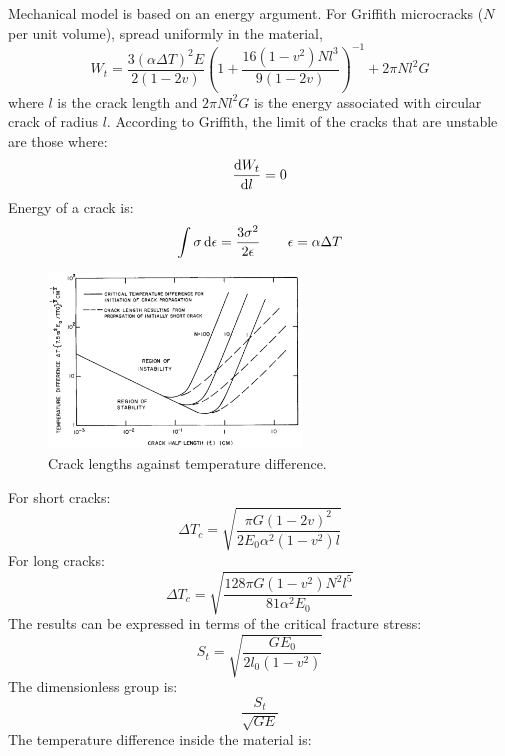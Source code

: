 Mechanical model is based on an energy argument. For Griffith microcracks ($N$ per unit volume), spread uniformly in the material,
\begin{equation}
    W_t = \frac{3\left(\alpha\Delta T\right)^2E}{2\left(1-2v\right)}\left(1 + \frac{16\left(1-v^2\right)Nl^3}{9\left(1-2v\right)}\right)^{-1} + 2\pi Nl^2 G
\end{equation}
where $l$ is the crack length and $2\pi Nl^2 G$ is the energy associated with circular crack of radius $l$. According to Griffith, the limit of the cracks that are unstable are those where:
\begin{equation}
    \frac{\dif W_t}{\dif l} = 0
\end{equation}
Energy of a crack is:
\begin{equation}
    \int \sigma \dif \epsilon = \frac{3\sigma^2}{2\epsilon} \qquad \epsilon = \alpha \Delta T
\end{equation}
\begin{figure}[H]
    \centering
    \includegraphics[width = 0.6\textwidth]{img/figure54.png}
    \caption{Crack lengths against temperature difference.}
\end{figure}
For short cracks:
\begin{equation}
    \Delta T_c = \sqrt{\frac{\pi G \left(1 - 2v\right)^2}{2E_0\alpha^2\left(1-v^2\right)l}}
\end{equation}
For long cracks:
\begin{equation}
    \Delta T_c = \sqrt{\frac{128\pi G \left(1-v^2\right)N^2l^5}{81\alpha^2 E_0}}
\end{equation}
The results can be expressed in terms of the critical fracture stress:
\begin{equation}
    S_t = \sqrt{\frac{GE_0}{2l_0\left(1-v^2\right)}}
\end{equation}
The dimensionless group is:
\begin{equation}
    \frac{S_t}{\sqrt{GE}}
\end{equation}
The temperature difference inside the material is:
